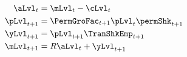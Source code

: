   \begin{equation*}\begin{gathered}\begin{aligned}
        \aLvl_{\prd}  & = \mLvl_{\prd}-\cLvl_{\prd}
        \\      \pLvl_{\prd+1}  & = \PermGroFac_{\prd+1}\pLvl_{\prd}\permShk_{\prd+1}
        \\      \yLvl_{\prd+1}  & = \pLvl_{\prd+1}\TranShkEmp _{\prd+1}
        \\      \mLvl_{\prd+1}  & = \Rfree \aLvl_{\prd}+\yLvl_{\prd+1}
      \end{aligned}\end{gathered}\end{equation*}

